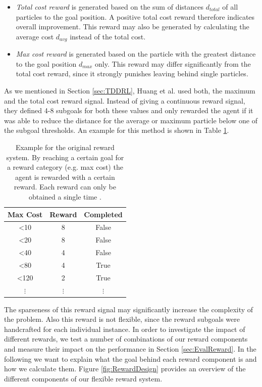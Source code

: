 \begin{itemize}
    \item \textit{Total cost reward} is generated based on the sum of distances $d_{total}$ of all particles to the goal position. A positive total cost reward therefore indicates overall improvement. This reward may also be generated by calculating the average cost $d_{avg}$ instead of the total cost.
    \item \textit{Max cost reward} is generated based on the particle with the greatest distance to the goal position $d_{max}$ only. This reward may differ significantly from the total cost reward, since it strongly punishes leaving behind single particles. 
\end{itemize}

As we mentioned in Section \ref{sec:TDDRL}, Huang et al. used both, the maximum and the total cost reward signal. Instead of giving a continuous reward signal, they defined 4-8 subgoals for both these values and only rewarded the agent if it was able to reduce the distance for the average or maximum particle below one of the subgoal thresholds. An example for this method is shown in Table \ref{tab:OriginalRewards}.

\begin{table} [ht]
    \begin{center}
        \begin{tabular}{|c|c|c|}
            \hline
            Max Cost & Reward & Completed \\
            \hline
            <10 & 8 & False \\
            <20 & 8 & False \\
            <40 & 4 & False \\
            <80 & 4 & True \\
            <120 & 2 & True \\
            $\vdots$ & $\vdots$ & $\vdots$ \\
            \hline
        \end{tabular}
    \end{center}
    \caption[Original Reward Example]{Example for the original reward system. By reaching a certain goal for a reward category (e.g. max cost) the agent is rewarded with a certain reward. Each reward can only be obtained a single time \cite{huang2019}.} \label{tab:OriginalRewards}
\end{table}


The sparseness of this reward signal may significantly increase the complexity of the problem. Also this reward is not flexible, since the reward subgoals were handcrafted for each individual instance. In order to investigate the impact of different rewards, we test a number of combinations of our reward components and measure their impact on the performance in Section \ref{sec:EvalReward}. In the following we want to explain what the goal behind each reward component is and how we calculate them. Figure \ref{fig:RewardDesign} provides an overview of the different components of our flexible reward system.

